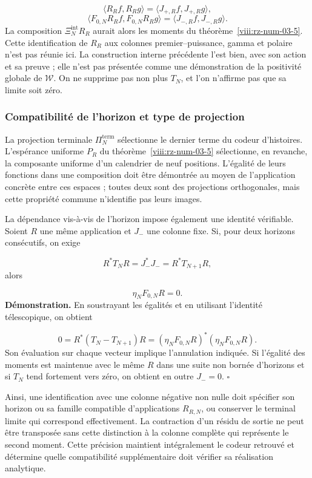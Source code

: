 \[
\langle R_Rf,R_Rg\rangle
=\langle J_{+,R}f,J_{+,R}g\rangle,
\]
\[
\langle F_{0,N}R_Rf,F_{0,N}R_Rg\rangle
=\langle J_{-,R}f,J_{-,R}g\rangle.
\]
La composition \(\Xi_N^{\mathrm{int}}R_R\) aurait alors les moments du théorème~\ref{viii:rz-num-03-5}. Cette identification de \(R_R\) aux colonnes premier–puissance, gamma et polaire n’est pas réunie ici. La construction interne précédente l’est bien, avec son action et sa preuve ; elle n’est pas présentée comme une démonstration de la positivité globale de \(\mathscr W\). On ne supprime pas non plus \(T_N\), et l’on n’affirme pas que sa limite soit zéro.

\subsubsection*{Compatibilité de l'horizon et type de projection}
La projection terminale \(\Pi_N^{\mathrm{term}}\) sélectionne le dernier terme du codeur d'histoires. L'espérance uniforme \(P_R\) du théorème~\ref{viii:rz-num-03-5} sélectionne, en revanche, la composante uniforme d'un calendrier de neuf positions. L'égalité de leurs fonctions dans une composition doit être démontrée au moyen de l'application concrète entre ces espaces ; toutes deux sont des projections orthogonales, mais cette propriété commune n'identifie pas leurs images.

La dépendance vis-à-vis de l'horizon impose également une identité vérifiable. Soient \(R\) une même application et \(J_-\) une colonne fixe. Si, pour deux horizons consécutifs, on exige

\[
R^*T_NR=J_-^*J_-=R^*T_{N+1}R,
\]
alors

\[
\eta_NF_{0,N}R=0.
\]
\textbf{Démonstration.} En soustrayant les égalités et en utilisant l’identité télescopique, on obtient

\[
0=R^*(T_N-T_{N+1})R
=(\eta_NF_{0,N}R)^*(\eta_NF_{0,N}R).
\]
Son évaluation sur chaque vecteur implique l’annulation indiquée. Si l’égalité des moments est maintenue avec le même \(R\) dans une suite non bornée d’horizons et si \(T_N\) tend fortement vers zéro, on obtient en outre \(J_-=0\). \hfill\(\square\)

Ainsi, une identification avec une colonne négative non nulle doit spécifier son horizon ou sa famille compatible d'applications \(R_{R,N}\), ou conserver le terminal limite qui correspond effectivement. La contraction d'un résidu de sortie ne peut être transposée sans cette distinction à la colonne complète qui représente le second moment. Cette précision maintient intégralement le codeur retrouvé et détermine quelle compatibilité supplémentaire doit vérifier sa réalisation analytique.

